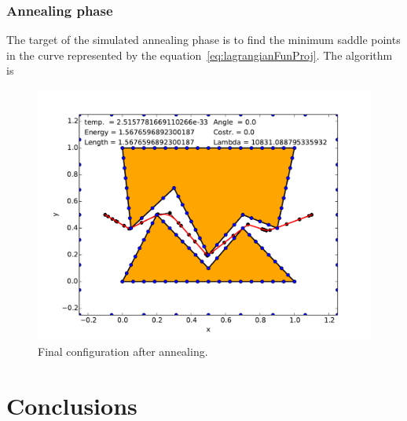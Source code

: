 \documentclass[a4paper]{article}
\begin{document}
\subsubsection{Annealing phase}
The target of the simulated annealing phase is to find the minimum
saddle points in
the curve represented by the
equation~\eqref{eq:lagrangianFunProj}. The algorithm is

\begin{figure}[htb]
  \centering
  \includegraphics[width=\textwidth]{img/final.pdf}
  \caption{Final configuration after annealing.}
  \label{fig:final}
\end{figure}

\section{Conclusions}
\end{document}

